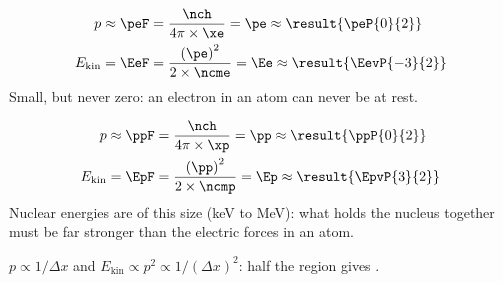 \begin{abcliste}
\abc
\begin{align}
 p &\approx \peF = \frac{\nch}{4\pi\times\xe} = \pe \approx \result{\peP{0}{2}} \\
 E_\mathrm{kin} &= \EeF = \frac{\left(\pe\right)^2}{2\times\ncme} = \Ee \approx \result{\EevP{-3}{2}}
\end{align}
Small, but never zero: an electron in an atom can never be at rest.

\abc
\begin{align}
 p &\approx \ppF = \frac{\nch}{4\pi\times\xp} = \pp \approx \result{\ppP{0}{2}} \\
 E_\mathrm{kin} &= \EpF = \frac{\left(\pp\right)^2}{2\times\ncmp} = \Ep \approx \result{\EpvP{3}{2}}
\end{align}
Nuclear energies are of this size (\si{\kilo\electronvolt} to \si{\mega\electronvolt}): what holds the nucleus together must be far stronger than the electric forces in an atom.

\abc $p \propto 1/\Delta x$ and $E_\mathrm{kin} \propto p^2 \propto 1/(\Delta x)^2$: half the region gives .
\end{abcliste}
